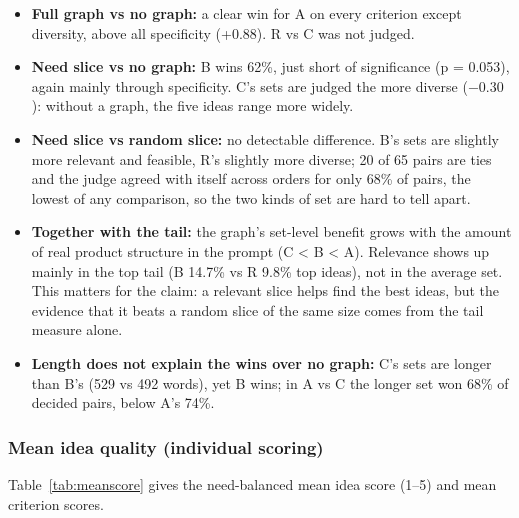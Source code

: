 \begin{itemize}
\tightlist
\item
  \textbf{Full graph vs no graph:} a clear win for A on every criterion except diversity, above all specificity (+0.88). R vs C was not judged.
\item
  \textbf{Need slice vs no graph:} B wins 62\%, just short of significance (p = 0.053), again mainly through specificity. C's sets are judged the more diverse ($-0.30$): without a graph, the five ideas range more widely.
\item
  \textbf{Need slice vs random slice:} no detectable difference. B's sets are slightly more relevant and feasible, R's slightly more diverse; 20 of 65 pairs are ties and the judge agreed with itself across orders for only 68\% of pairs, the lowest of any comparison, so the two kinds of set are hard to tell apart.
\item
  \textbf{Together with the tail:} the graph's set-level benefit grows with the amount of real product structure in the prompt (C \textless{} B \textless{} A). Relevance shows up mainly in the top tail (B 14.7\% vs R 9.8\% top ideas), not in the average set. This matters for the claim: a relevant slice helps find the best ideas, but the evidence that it beats a random slice of the same size comes from the tail measure alone.
\item
  \textbf{Length does not explain the wins over no graph:} C's sets are longer than B's (529 vs 492 words), yet B wins; in A vs C the longer set won 68\% of decided pairs, below A's 74\%.
\end{itemize}

\hypertarget{mean-idea-quality-individual-scoring}{%
\subsubsection{Mean idea quality (individual scoring)}\label{mean-idea-quality-individual-scoring}}

Table~\ref{tab:meanscore} gives the need-balanced mean idea score (1--5) and mean criterion scores.

